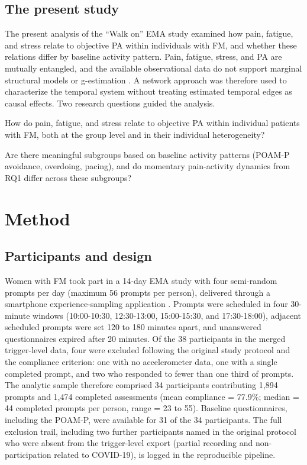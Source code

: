 \documentclass[11pt,a4paper]{article}
\begin{document}
\subsection{The present study}
The present analysis of the ``Walk on'' EMA study examined how pain, fatigue, and stress
relate to objective PA within individuals with FM, and whether these relations differ by
baseline activity pattern. Pain, fatigue, stress, and PA are mutually entangled, and the
available observational data do not support marginal structural models or g-estimation
\citep{rohrer2018thinking}. A network approach was therefore used to characterize the
temporal system without treating estimated temporal edges as causal effects. Two research
questions guided the analysis.

\begin{description}[leftmargin=2.2em,itemsep=2pt]
  \item[\textbf{RQ1.}] How do pain, fatigue, and stress relate to objective PA within
  individual patients with FM, both at the group level and in their individual heterogeneity?
  \item[\textbf{RQ2.}] Are there meaningful subgroups based on baseline activity patterns
  (POAM-P avoidance, overdoing, pacing), and do momentary pain-activity dynamics from RQ1
  differ across these subgroups?
\end{description}

\section{Method}

\subsection{Participants and design}
Women with FM took part in a 14-day EMA study with four semi-random prompts per day
(maximum 56 prompts per person), delivered through a smartphone experience-sampling
application \citep{koval2019sema3}. Prompts were scheduled in four 30-minute windows
(10:00-10:30, 12:30-13:00, 15:00-15:30, and 17:30-18:00), adjacent scheduled prompts were
set 120 to 180 minutes apart, and unanswered questionnaires expired after 20 minutes. Of
the 38 participants in the merged trigger-level data,
four were excluded following the original study protocol and the compliance criterion: one
with no accelerometer data, one with a single completed prompt, and two who responded to fewer
than one third of prompts. The analytic sample therefore comprised 34 participants contributing
1,894 prompts and 1,474 completed assessments (mean compliance = 77.9\%; median = 44 completed
prompts per person, range = 23 to 55). Baseline questionnaires, including the POAM-P, were
available for 31 of the 34 participants. The full exclusion trail, including two further
participants named in the original protocol who were absent from the trigger-level export
(partial recording and non-participation related to COVID-19), is logged in the reproducible
pipeline.
\end{document}
